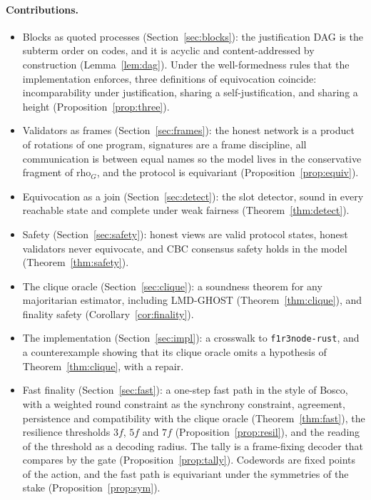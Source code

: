 \documentclass[11pt]{article}
\theoremstyle{definition}
\theoremstyle{remark}
\newcommand{\calc}{\mathrm{rho}_G}
\begin{document}
\paragraph{Contributions.}
\begin{itemize}[leftmargin=1.5em]
\item Blocks as quoted processes (Section~\ref{sec:blocks}): the justification
  DAG is the subterm order on codes, and it is acyclic and content-addressed by
  construction (Lemma~\ref{lem:dag}). Under the well-formedness rules that the
  implementation enforces, three definitions of equivocation coincide:
  incomparability under justification, sharing a self-justification, and
  sharing a height (Proposition~\ref{prop:three}).
\item Validators as frames (Section~\ref{sec:frames}): the honest network is a
  product of rotations of one program, signatures are a frame discipline, all
  communication is between equal names so the model lives in the conservative
  fragment of $\calc$, and the protocol is equivariant
  (Proposition~\ref{prop:equiv}).
\item Equivocation as a join (Section~\ref{sec:detect}): the slot detector,
  sound in every reachable state and complete under weak fairness
  (Theorem~\ref{thm:detect}).
\item Safety (Section~\ref{sec:safety}): honest views are valid protocol
  states, honest validators never equivocate, and CBC consensus safety holds in
  the model (Theorem~\ref{thm:safety}).
\item The clique oracle (Section~\ref{sec:clique}): a soundness theorem for any
  majoritarian estimator, including LMD-GHOST (Theorem~\ref{thm:clique}),
  and finality safety (Corollary~\ref{cor:finality}).
\item The implementation (Section~\ref{sec:impl}): a crosswalk to
  \texttt{f1r3node-rust}, and a counterexample showing that its clique oracle
  omits a hypothesis of Theorem~\ref{thm:clique}, with a repair.
\item Fast finality (Section~\ref{sec:fast}): a one-step fast path in the style
  of Bosco, with a weighted round constraint as the synchrony constraint,
  agreement, persistence and compatibility with the clique oracle
  (Theorem~\ref{thm:fast}), the resilience thresholds $3f$, $5f$ and $7f$
  (Proposition~\ref{prop:resil}), and the reading of the threshold as a
  decoding radius. The tally is a frame-fixing decoder that compares by the
  gate (Proposition~\ref{prop:tally}). Codewords are fixed points of the
  action, and the fast path is equivariant under the symmetries of the stake
  (Proposition~\ref{prop:sym}).
\end{itemize}
\end{document}

